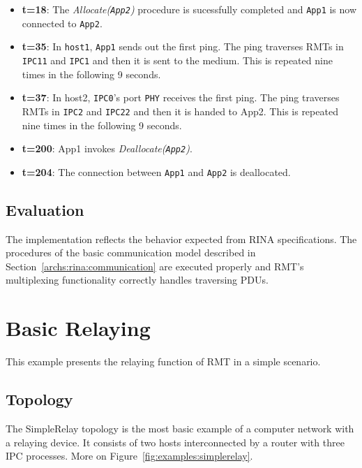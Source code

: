 \begin{itemize}
            \item \textbf{t=18}: The \emph{Allocate(\texttt{App2})} procedure is sucessfully completed and \texttt{App1} is now connected to \texttt{App2}.

            \item \textbf{t=35}: In \texttt{host1}, \texttt{App1} sends out the first ping. The ping traverses RMTs in \texttt{IPC11} and \texttt{IPC1} and then it is sent to the medium. This is repeated nine times in the following 9 seconds.

            \item \textbf{t=37}: In host2, \texttt{IPC0}'s port \texttt{PHY} receives the first ping. The ping traverses RMTs in \texttt{IPC2} and \texttt{IPC22} and then it is handed to App2. This is repeated nine times in the following 9 seconds.

            \item \textbf{t=200}: App1 invokes \emph{Deallocate(\texttt{App2})}.

            \item \textbf{t=204}: The connection between \texttt{App1} and \texttt{App2} is deallocated.
            \end{itemize}

        \subsection{Evaluation}

            The implementation reflects the behavior expected from RINA specifications. The procedures of the basic communication model described in Section~\ref{archs:rina:communication} are executed properly and RMT's multiplexing functionality correctly handles traversing PDUs.

    \section{Basic Relaying}

        This example presents the relaying function of RMT in a simple scenario.

        \subsection{Topology}

            The SimpleRelay topology is the most basic example of a computer network with a relaying device. It consists of two hosts interconnected by a router with three IPC processes. More on Figure~\ref{fig:examples:simplerelay}.

